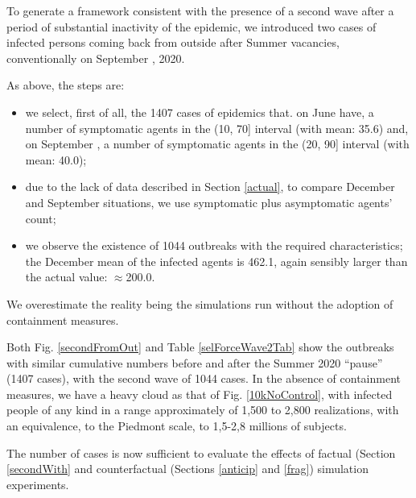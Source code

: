 \documentclass[graybox]{svmult}
\begin{document}
To generate a framework consistent with the presence of a second wave after a period of substantial inactivity of the epidemic, we introduced two cases of infected persons coming back from outside after Summer vacancies, conventionally on September , 2020.

As above, the steps are:
\begin{itemize}

\item we select, first of all, the 1407 cases of epidemics that. on June  have, a number of symptomatic agents in the (10, 70] interval (with mean: 35.6) and, on September , a number of symptomatic agents in the (20, 90] interval (with mean: 40.0);

\item due to the lack of data described in Section \ref{actual}, to compare December  and September  situations, we use symptomatic plus asymptomatic agents' count;

\item we observe the existence of 1044 outbreaks with the required characteristics; the December mean of the infected agents is 462.1, again sensibly larger than the actual value: $\approx$200.0. 

\end{itemize}

We overestimate the reality being the simulations run without the adoption of containment measures.

Both Fig. \ref{secondFromOut} and Table \ref{selForceWave2Tab} show the outbreaks with similar cumulative numbers before and after the Summer 2020 ``pause'' (1407 cases), with the second wave of 1044 cases. In the absence of containment measures, we have a heavy cloud as that of Fig. \ref{10kNoControl}, with infected people of any kind in a range approximately of 1,500 to 2,800 realizations, with an equivalence, to the Piedmont scale, to 1,5-2,8 millions of subjects.

The number of cases is now sufficient to evaluate the effects of factual (Section \ref{secondWith} and counterfactual (Sections \ref{anticip} and \ref{frag}) simulation experiments.
\end{document}
